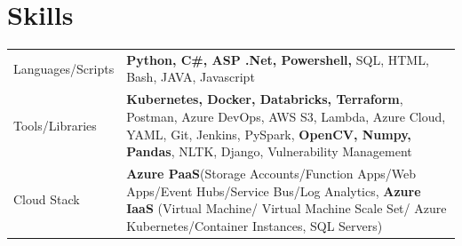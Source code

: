 \documentclass[a4paper,3pt]{article}
\begin{document}


\section{Skills}
\begin{tabularx}{\linewidth}{@{}l X@{}}
    Languages/Scripts & \normalsize{\textbf{Python, C\#, ASP .Net, Powershell,} SQL, HTML, Bash, JAVA, Javascript}                                                                                                                                         \\
    Tools/Libraries   & \normalsize{\textbf{Kubernetes, Docker, Databricks, Terraform}, Postman, Azure DevOps, AWS S3, Lambda, Azure Cloud, YAML, Git, Jenkins, PySpark, \textbf{OpenCV, Numpy, Pandas}, NLTK, Django, Vulnerability Management}                            \\
    Cloud Stack       & \normalsize{\textbf{Azure PaaS}(Storage Accounts/Function Apps/Web Apps/Event Hubs/Service Bus/Log Analytics}, \textbf{Azure IaaS} (Virtual Machine/ Virtual Machine Scale Set/ Azure Kubernetes/Container Instances, SQL Servers)
\end{tabularx}


\end{document}
